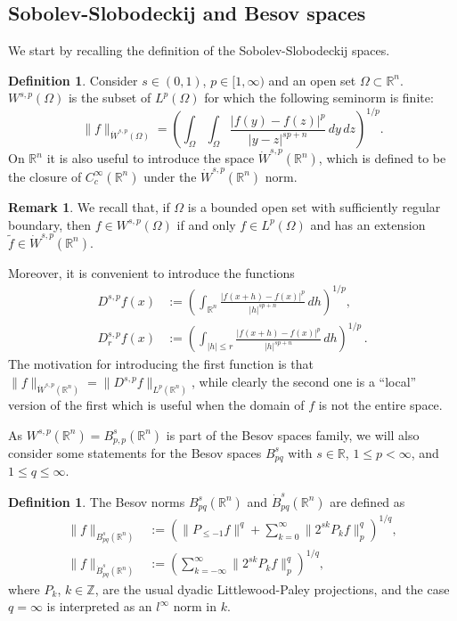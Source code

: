 \documentclass[11pt,reqno]{amsart}
\newcommand{\R}{\mathbb R}
\theoremstyle{definition}
\newtheorem{definition}[theorem]{Definition}
\newtheorem{remark}[theorem]{Remark}
\numberwithin{equation}{section}
\begin{document}
\subsection{Sobolev-Slobodeckij and Besov spaces} We start by recalling 
the definition of the Sobolev-Slobodeckij spaces.

\begin{definition}\label{d:Sob-Slob}
Consider $s\in(0,1)$, $p\in [1,\infty)$ and an open set $\Omega\subset \mathbb R^n$. $W^{s,p} (\Omega)$ is the subset of $L^p (\Omega)$ for which the following seminorm is finite:
\[
\|f\|_{\dot{W}^{s,p}(\Omega)}=\left(\int_\Omega\int_\Omega\frac{|f(y)-f(z)|^p}{|y-z|^{sp+n}}\,dy\,dz\right)^{1/p}.
\]
On $\mathbb R^n$ it is also useful to introduce the space
$\dot{W}^{s,p}(\R^n)$, which is defined to be the closure of $C^{\infty}_c(\R^n)$ under the $\dot{W}^{s,p} (\mathbb R^n)$ norm.
\end{definition}

\begin{remark}\label{r:extension}
We recall that, if $\Omega$ is a bounded open set with sufficiently regular boundary, then $f\in W^{s,p} (\Omega)$ if and only $f\in L^p (\Omega)$ and has an extension $\tilde{f}\in \dot{W}^{s,p} (\mathbb R^n)$. 
\end{remark}


Moreover, it is convenient to introduce the functions
\begin{align}
D^{s,p}f(x) &:=\left(\int_{\R^n}\frac{|f(x+h)-f(x)|^p}{|h|^{sp+n}}\,dh\right)^{1/p},\label{eq:def of fractional deriavitve}\\
D^{s,p}_rf(x)&:=\left(\int_{|h|\le r}\frac{|f(x+h)-f(x)|^p}{|h|^{sp+n}}\,dh\right)^{1/p}\, .\label{eq:def of local fractional deriavitve}
\end{align}
The motivation for introducing the first function is that $\|f\|_{\dot{W}^{s,p} (\mathbb R^n)} = \|D^{s,p} f\|_{L^p (\mathbb R^n)}$, while clearly the second one is a ``local'' version of the first which is useful when the domain of $f$ is not the entire space. 

As $W^{s,p} (\mathbb R^n) =B^s_{p,p} (\mathbb R^n)$ is part of the Besov spaces family, we will also consider some statements for the Besov spaces $B^s_{pq}$ with $s\in \mathbb R$, $1\le p<\infty$, and $1\le q\le \infty$.

\begin{definition}
The Besov norms $B^s_{pq} (\mathbb R^n)$ and $\dot{B}^s_{pq} (\mathbb R^n)$ are defined as
\begin{align*}
\|f\|_{B^{s}_{pq} (\mathbb R^n)}&:=\left(\|P_{\le -1}f\|^q+\sum_{k=0}^\infty \|2^{sk}P_kf\|_p^q\right)^{1/q},\\
\|f\|_{\dot{B}^s_{pq} (\mathbb R^n)}&:=\left(\sum_{k=-\infty}^\infty \|2^{sk}P_kf\|_p^q\right)^{1/q},
\end{align*}
where $P_k$, $k\in \mathbb Z$, are the usual dyadic Littlewood-Paley projections, and the case $q=\infty$ is interpreted as an $l^\infty$ norm in $k$.
\end{definition}
\end{document}
